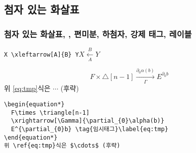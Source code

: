 \documentclass{beamer}
\begin{document}

\subsection{첨자 있는 화살표}


\begin{frame}[fragile]

\frametitle{첨자 있는 화살표, , 편미분, 하첨자, 강제 태그, 레이블}

\begin{block}{}
\verb!X \xleftarrow[A]{B} Y!\qquad$X\xleftarrow[A]{B}Y$
\end{block}

\begin{block}{}
\begin{equation*}
  F\times \triangle[n-1]
  \xrightarrow[\Gamma]{\partial_{0}\alpha(b)}
  E^{\partial_{0}b} \tag{임시태그}\label{eq:tmp}
\end{equation*}
위 \ref{eq:tmp}식은 $\cdots$ (후략)
\end{block}


\begin{block}{}
\begin{center}
\begin{verbatim}
\begin{equation*}
  F\times \triangle[n-1]
  \xrightarrow[\Gamma]{\partial_{0}\alpha(b)}
  E^{\partial_{0}b} \tag{임시태그}\label{eq:tmp}
\end{equation*}
위 \ref{eq:tmp}식은 $\cdots$ (후략)
\end{verbatim}
\end{center}
\end{block}

\end{frame}
\end{document}
